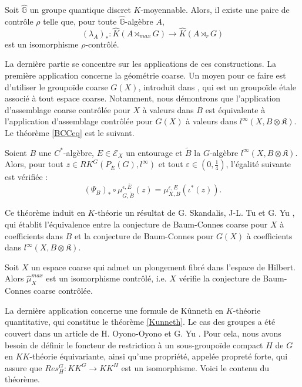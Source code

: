 \begin{prop}
Soit $\hat{\mathbb G}$ un groupe quantique discret $K$-moyennable. Alors, il existe une paire de contrôle $\rho$ telle que, pour toute $\hat{\mathbb G}$-algèbre $A$,
\[(\lambda_A)_* : \hat K(A\rtimes_{max} G) \rightarrow \hat K(A\rtimes_r G) \]
est un isomorphisme $\rho$-contrôlé.
\end{prop}

La dernière partie se concentre sur les applications de ces constructions. La première application concerne la géométrie coarse. Un moyen pour ce faire est d'utiliser le groupoïde coarse $G(X)$, introduit dans \cite{SkTuYu}, qui est un groupoïde étale associé à tout espace coarse. Notamment, nous démontrons que l'application d'assemblage coarse contrôlée pour $X$ à valeurs dans $B$ est équivalente à l'application d'assemblage contrôlée pour $G(X)$ à valeurs dans $l^\infty(X,B\otimes\mathfrak K)$. Le théorème \ref{BCCeq} est le suivant.

\begin{thm}
Soient $B$ une $C^*$-algèbre, $E\in\mathcal E_X$ un entourage et $\tilde B$ la $G$-algèbre $l^\infty(X,B\otimes \mathfrak K)$. Alors, pour tout $z\in RK^G(P_{\overline E}(G),l^\infty)$ et tout $\varepsilon\in(0,\frac{1}{4})$, l'égalité suivante est vérifiée :
\[(\Psi_B)_*\circ\mu^{\epsilon,\overline E}_{G,\tilde B} (z) = \mu_{X,B}^{\epsilon,E}(\iota^*(z)).\]
\end{thm}

Ce théorème induit en $K$-théorie un résultat de G. Skandalis, J-L. Tu et G. Yu \cite{SkTuYu}, qui établit l'équivalence entre la conjecture de Baum-Connes coarse pour $X$ à coefficients dans $B$ et la conjecture de Baum-Connes pour $G(X)$ à coefficients dans $l^\infty(X,B\otimes \mathfrak K)$. \\

\begin{cor}
Soit $X$ un espace coarse qui admet un plongement fibré dans l'espace de Hilbert. Alors $\hat \mu_{X}^{max}$ est un isomorphisme contrôlé, i.e. $X$ vérifie la conjecture de Baum-Connes coarse contrôlée.
\end{cor}

La dernière application concerne une formule de Kûnneth en $K$-théorie quantitative, qui constitue le théorème \ref{Kunneth}. Le cas des groupes a été couvert dans un article de H. Oyono-Oyono et G. Yu \cite{OY4}. Pour cela, nous avons besoin de définir le foncteur de restriction à un sous-groupoïde compact $H$ de $G$ en $KK$-théorie équivariante, ainsi qu'une propriété, appelée propreté forte, qui assure que $Res_H^G : KK^G \rightarrow KK^H$ est un isomorphisme. Voici le contenu du théorème.

